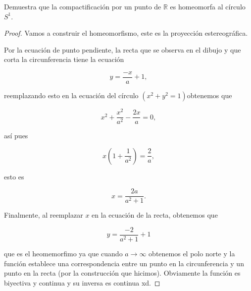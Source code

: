 
\item Demuestra que la compactificación por un punto de $\mathbb{R}$ es homeomorfa al círculo $S^1$.\\

\begin{proof}
    Vamos a construir el homeomorfismo, este es la proyección estereográfica.

\begin{center}
    
\end{center}


Por la ecuación de punto pendiente, la recta que se observa en el dibujo y que corta la circunferencia  tiene la ecuación 

$$y=\frac{-x}{a}+1,$$

reemplazando esto en la ecuación del círculo $(x^2+y^2=1)$obtenemos que 

$$x^2+\frac{x^2}{a^2}-\frac{2x}{a}=0,$$

así pues

$$x\left(1+\frac{1}{a^2}\right)=\frac{2}{a},$$

esto es 

$$x=\frac{2a}{a^2+1}.$$

Finalmente, al reemplazar $x$ en la ecuación de la recta, obtenemos que 

$$y=\frac{-2}{a^2+1}+1$$

que es el heomemorfimo ya que cuando $a\to \infty$ obtenemos el polo norte y la función establece una correspondencia entre un punto en la circunferencia y un punto en la recta (por la construcción que hicimos). Obviamente la función es biyectiva y continua y su inversa es continua xd.

\end{proof}

